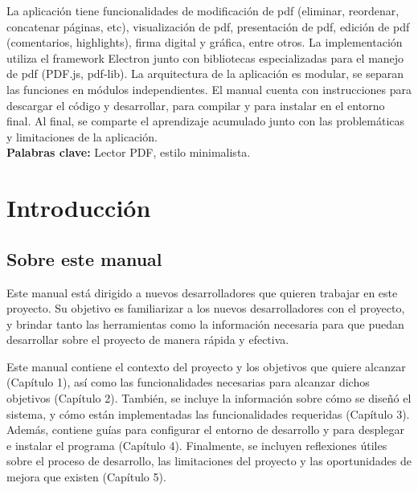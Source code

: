 La aplicación tiene funcionalidades de modificación de pdf (eliminar, reordenar, concatenar páginas, etc), visualización de pdf, presentación de pdf, edición de pdf (comentarios, highlights), firma digital y gráfica, entre otros. La implementación utiliza el framework Electron junto con bibliotecas especializadas para el manejo de pdf (PDF.js, pdf-lib). La arquitectura de la aplicación es modular, se separan las funciones en módulos independientes. El manual cuenta con instrucciones para descargar el código y desarrollar, para compilar y para instalar en el entorno final. Al final, se comparte el aprendizaje acumulado junto con las problemáticas y limitaciones de la aplicación.\\
\textbf{Palabras clave: }Lector PDF, estilo minimalista.

\newpage



\pagestyle{empty}
\tableofcontents %

\listoffigures %
\cleardoublepage

\pagestyle{fancy}

\newpage
{} %


\chapter{Introducción}
\label{sec:intro}

\section{Sobre este manual}

Este manual está dirigido a nuevos desarrolladores que quieren trabajar en este proyecto. Su objetivo es familiarizar a los nuevos desarrolladores con el proyecto, y brindar tanto las herramientas como la información necesaria para que puedan desarrollar sobre el proyecto de manera rápida y efectiva.

Este manual contiene el contexto del proyecto y los objetivos que quiere alcanzar (Capítulo 1), así como las funcionalidades necesarias para alcanzar dichos objetivos (Capítulo 2). También, se incluye la información sobre cómo se diseñó el sistema, y cómo están implementadas las funcionalidades requeridas (Capítulo 3). Además, contiene guías para configurar el entorno de desarrollo y para desplegar e instalar el programa (Capítulo 4). Finalmente, se incluyen reflexiones útiles sobre el proceso de desarrollo, las limitaciones del proyecto y las oportunidades de mejora que existen (Capítulo 5).

